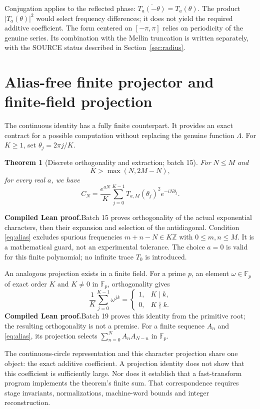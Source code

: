 \documentclass[11pt,a4paper]{article}
\newtheorem{theorem}{Theorem}[section]
\theoremstyle{remark}
\newcommand{\Lam}{\Lambda}
\newcommand{\Z}{\mathbb Z}
\newcommand{\paid}{\textbf{Compiled Lean proof.}\space}
\begin{document}
Conjugation applies to the reflected phase:
$\overline{T_a(-\theta)}=T_a(\theta)$. The product $|T_a(\theta)|^2$
would select frequency differences; it does not yield the required additive
coefficient. The form centered on $[-\pi,\pi]$ relies on periodicity of the
genuine series. Its combination with the Mellin truncation is written
separately, with the SOURCE status described in Section~\ref{sec:radius}.

\clearpage
\section{Alias-free finite projector and finite-field projection}\label{sec:finite}
The continuous identity has a fully finite counterpart. It provides an exact
contract for a possible computation without replacing the genuine function
$\Lam$. For $K\ge1$, set $\theta_j=2\pi j/K$.

\begin{theorem}[Discrete orthogonality and extraction; batch 15]
For $N\le M$ and
\begin{equation}\label{eq:alias}
K>\max(N,2M-N),
\end{equation}
for every real $a$, we have
\begin{equation}\label{eq:discrete}
C_N=\frac{e^{aN}}{K}\sum_{j=0}^{K-1}
T_{a,M}(\theta_j)^2e^{-iN\theta_j}.
\end{equation}
\end{theorem}
\paid Batch 15 proves orthogonality of the actual exponential characters,
then their expansion and selection of the antidiagonal. Condition
\eqref{eq:alias} excludes spurious frequencies $m+n-N\in K\Z$ with
$0\le m,n\le M$. It is a mathematical guard, not an experimental tolerance.
The choice $a=0$ is valid for this finite polynomial; no infinite trace
$T_0$ is introduced.

An analogous projection exists in a finite field. For a prime $p$, an element
$\omega\in\mathbb F_p$ of exact order $K$ and $K\ne0$ in $\mathbb F_p$,
orthogonality gives
\[
\frac1K\sum_{j=0}^{K-1}\omega^{jk}
=\begin{cases}1,&K\mid k,\\0,&K\nmid k.\end{cases}
\]
\paid Batch 19 proves this identity from the primitive root;
the resulting orthogonality is not a premise. For a finite sequence $A_n$
and \eqref{eq:alias}, its projection selects
$\sum_{n=0}^N A_nA_{N-n}$ in $\mathbb F_p$.

The continuous-circle representation and this character projection share
one object: the exact additive coefficient. A projection identity does not
show that this coefficient is sufficiently large. Nor does it establish
that a fast-transform program implements the theorem's finite sum.
That correspondence requires stage invariants, normalizations, machine-word
bounds and integer reconstruction.
\end{document}
